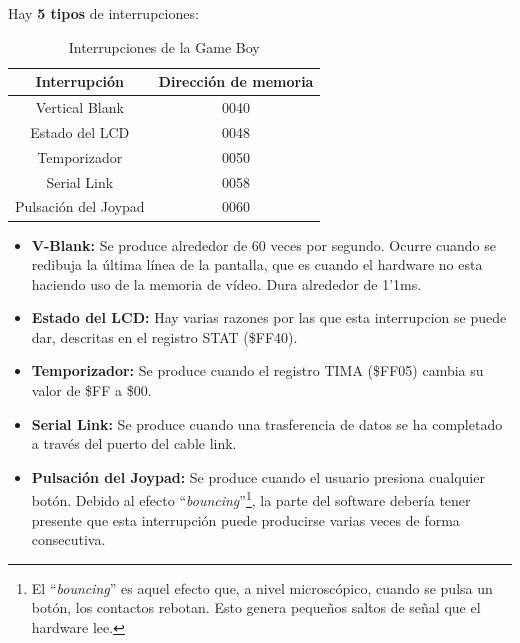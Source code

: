 Hay \textbf{5 tipos} de interrupciones:

\begin{table}[h!]

\centering
\begin{tabular}{|c|l|l|l|c|}

\hline

\multicolumn{4}{|c|}{\textbf{Interrupción}}         & \textbf{Dirección de memoria} \\ \hline

\multicolumn{4}{|c|}{Vertical Blank}       & 0040                 \\ \hline

\multicolumn{4}{|c|}{Estado del LCD}       & 0048                 \\ \hline

\multicolumn{4}{|c|}{Temporizador}         & 0050                 \\ \hline

\multicolumn{4}{|c|}{Serial Link}          & 0058                 \\ \hline

\multicolumn{4}{|c|}{Pulsación del Joypad} & 0060                 \\ \hline

\end{tabular}

\caption{Interrupciones de la Game Boy}
\label{table:interrupts}
\end{table}

\begin{itemize}
	\item \textbf{V-Blank:} Se produce alrededor de 60 veces por segundo. Ocurre cuando se redibuja la última línea de la pantalla, que es cuando el hardware no esta haciendo uso de la memoria de vídeo. Dura alrededor de 1'1ms.
    \item \textbf{Estado del LCD:} Hay varias razones por las que esta interrupcion se puede dar, descritas en el registro STAT (\$FF40).
    \item \textbf{Temporizador:} Se produce cuando el registro TIMA (\$FF05) cambia su valor de \$FF a \$00.
    \item \textbf{Serial Link:} Se produce cuando una trasferencia de datos se ha completado a través del puerto del cable link.
    \item \textbf{Pulsación del Joypad:} Se produce cuando el usuario presiona cualquier botón. Debido al efecto ``\textit{bouncing}''\footnote{El ``\textit{bouncing}'' es aquel efecto que, a nivel microscópico, cuando se pulsa un botón, los contactos rebotan. Esto genera pequeños saltos de señal que el hardware lee.}, la parte del software debería tener presente que esta interrupción puede producirse varias veces de forma consecutiva.
\end{itemize}

